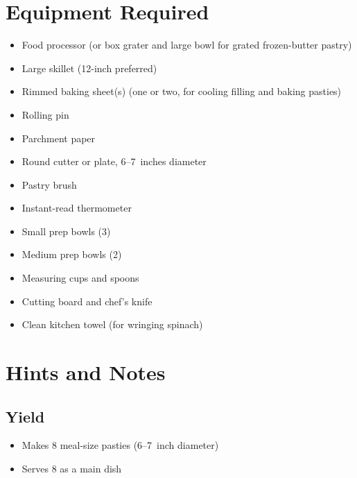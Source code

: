 \documentclass[11pt,letterpaper]{article}
\begin{document}
\section*{Equipment Required}
\begin{itemize}
    \item Food processor (or box grater and large bowl for grated frozen-butter pastry)
    \item Large skillet (12-inch preferred)
    \item Rimmed baking sheet(s) (one or two, for cooling filling and baking pasties)
    \item Rolling pin
    \item Parchment paper
    \item Round cutter or plate, 6--7~inches diameter
    \item Pastry brush
    \item Instant-read thermometer
    \item Small prep bowls (3)
    \item Medium prep bowls (2)
    \item Measuring cups and spoons
    \item Cutting board and chef's knife
    \item Clean kitchen towel (for wringing spinach)
\end{itemize}

\section*{Hints and Notes}

\subsection*{Yield}
\begin{itemize}
    \item Makes 8 meal-size pasties (6--7~inch diameter)
    \item Serves 8 as a main dish
\end{itemize}
\end{document}
